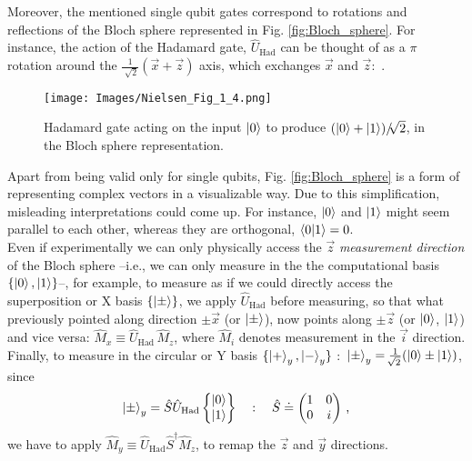 \documentclass[11pt]{article}
\numberwithin{equation}{section} %
\numberwithin{figure}{section} %
\begin{document}
\begin{appendices}
Moreover, the mentioned single qubit gates correspond to rotations and reflections of the Bloch sphere represented in Fig. \ref{fig:Bloch_sphere}. For instance, the action of the Hadamard gate, $\hat{U}_{\textrm{Had}}$ can be thought of as a $\pi$ rotation around the $	\frac{1}{\sqrt[]{2}}(\vec{x}+\vec{z})$ axis, which exchanges $\vec{x}$ and $\vec{z}$: $\,$\cite[p.~19, l.~11-14]{Nielsen}.

\begin{figure}[H] 
	\centering
	\texttt{[image: Images/Nielsen\_Fig\_1\_4.png]}
	\caption{Hadamard gate acting on the input $\ket{0}$ to produce $(\ket{0}+\ket{1})/\sqrt[]{2}$, in the Bloch sphere representation.}
	  \label{fig:Nielsen_Fig_1_4}
\end{figure}

Apart from being valid only for single qubits, Fig. \ref{fig:Bloch_sphere} is a form of representing complex vectors in a visualizable way. Due to this simplification, misleading interpretations could come up. For instance, $\ket{0}$ and $\ket{1}$ might seem parallel to each other, whereas they are orthogonal, $\braket{0|1}=0$.\\

Even if experimentally we can only physically access the $\vec{z}$ \emph{measurement direction} of the Bloch sphere --i.e., we can only measure in the the computational basis $\{\ket{0},\ket{1}\}$--, for example, to measure as if we could directly access the superposition or X basis $\{\ket{\pm}\}$, we apply $\hat{U}_{\textrm{Had}}$ before measuring, so that what previously pointed along direction $\pm\vec{x}$ (or $\ket{\pm}$), now points along $\pm\vec{z}$ (or $\ket{0}$, $\ket{1}$) and vice versa: $\hat{M}_x\equiv\hat{U}_{\textrm{Had}}\,\hat{M}_z$, where $\hat{M}_i$ denotes measurement in the $\vec{i}$ direction. Finally, to measure in the circular or Y basis $\{\ket{+}_y,\ket{-}_y\}$ $:$ $\ket{\pm}_y=\frac{1}{\sqrt[]{2}}(\ket{0}\pm\ket{1})$, since
\begin{equation}
\ket{\pm}_y=\hat{S}\hat{U}_{\textrm{Had}}\begin{Bmatrix}\ket{0}\\\ket{1}\end{Bmatrix}\quad : \quad \hat{S}\doteq\begin{pmatrix}1&0\\0&i\end{pmatrix}\,\textrm{,}
\end{equation}
we have to apply $\hat{M}_y\equiv\hat{U}_{\textrm{Had}}\hat{S}^\dagger\hat{M}_z$, to remap the $\vec{z}$ and $\vec{y}$ directions.



\end{appendices}
\end{document}
